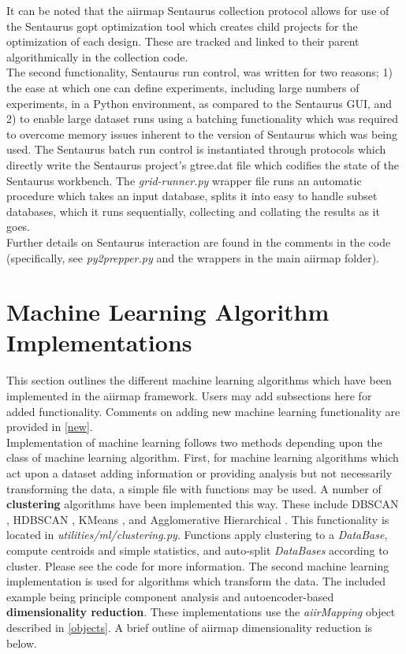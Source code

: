 \documentclass[a4paper,12pt,english]{article}
\begin{document}
    It can be noted that the aiirmap Sentaurus collection protocol allows for use of the Sentaurus gopt optimization tool which creates child projects for the optimization of each design. These are tracked and linked to their parent algorithmically in the collection code. \\

    The second functionality, Sentaurus run control, was written for two reasons; 1) the ease at which one can define experiments, including large numbers  of experiments, in a Python environment, as compared to the Sentaurus GUI, and 2) to enable large dataset runs using a batching functionality which was required to overcome memory issues inherent to the version of Sentaurus which was being used. The Sentaurus batch run control is instantiated through protocols which directly write the Sentaurus project’s gtree.dat file which codifies the state of the Sentaurus workbench. The \textit{grid-runner.py} wrapper file runs an automatic procedure which takes an input database, splits it into easy to handle subset databases, which it runs sequentially, collecting and collating the results as it goes.\\

    Further details on Sentaurus interaction are found in the comments in the code (specifically, see \textit{py2prepper.py} and the wrappers in the main aiirmap folder). \\



    \section{Machine Learning Algorithm Implementations} \label{ml}
    This section outlines the different machine learning algorithms which have been implemented in the aiirmap framework. Users may add subsections here for added functionality. Comments on adding new machine learning functionality are provided in \autoref{new}. \\
    
    Implementation of machine learning follows two methods depending upon the class of machine learning algorithm. First, for machine learning algorithms which act upon a dataset adding information or providing analysis but not necessarily transforming the data, a simple file with functions may be used. A number of \textbf{clustering} algorithms have been implemented this way. These include DBSCAN \cite{dbscan}, HDBSCAN \cite{hdbscan}, KMeans \cite{kmeans}, and Agglomerative Hierarchical \cite{agglo}. This functionality is located in \textit{utilities/ml/clustering.py}. Functions apply clustering to a \textit{DataBase}, compute centroids and simple statistics, and auto-split \textit{DataBases} according to cluster. Please see the code for more information. The second machine learning implementation is used for algorithms which transform the data. The included example being principle component analysis \cite{pca1, pca2} and autoencoder-based \cite{ae} \textbf{dimensionality reduction}. These implementations use the \textit{aiirMapping} object described in \autoref{objects}. A brief outline of aiirmap dimensionality reduction is below.\\
\end{document}
